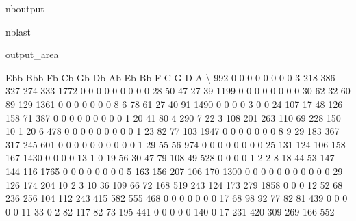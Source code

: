 \documentclass[letterpaper,10pt,english]{sphinxmanual}
\begin{document}
\begin{sphinxuseclass}{nboutput}
\begin{sphinxuseclass}{nblast}
{\begin{sphinxuseclass}{output_area}
\begin{sphinxuseclass}{}
\begin{sphinxVerbatim}[commandchars=\\\{\}]
      Ebb  Bbb  Fb   Cb   Gb   Db   Ab   Eb   Bb    F    C    G    D    A  \textbackslash{}
992     0    0   0    0    0    0    0    0    3  218  386  327  274  333
1772    0    0   0    0    0    0    0    0    0   28   50   47   27   39
1199    0    0   0    0    0    0    0    0   30   62   32   60   89  129
1361    0    0   0    0    0    0    0    8    6   78   61   27   40   91
1490    0    0   0    0    3    0    0   24  107   17   48  126  158   71
387     0    0   0    0    0    0    0    0    0    1   20   41   80    4
290     7   22   3  108  201  263  110   69  228  150   10    1   20    6
478     0    0   0    0    0    0    0    0    0    1   23   82   77  103
1947    0    0   0    0    0    0    0    8    9   29  183  367  317  245
601     0    0   0    0    0    0    0    0    0    0    1   29   55   56
974     0    0   0    0    0    0    0    0   25  131  124  106  158  167
1430    0    0   0    0   13    1    0   19   56   30   47   79  108   49
528     0    0   0    0    1    2    2    8   18   44   53  147  144  116
1765    0    0   0    0    0    0    0    0    5  163  156  207  106  170
1300    0    0   0    0    0    0    0    0    0    0    0   29  126  174
204    10    2   3   10   36  109   66   72  168  519  243  124  173  279
1858    0    0   0   12   52   68  236  256  104  112  243  415  582  555
468     0    0   0    0    0    0    0   17   68   98   92   77   82   81
439     0    0   0    0    0   11   33    0    2   82  117   82   73  195
441     0    0   0    0    0  140    0   17  231  420  309  269  166  552


\end{sphinxVerbatim}
\end{sphinxuseclass}
\end{sphinxuseclass}}
\end{sphinxuseclass}
\end{sphinxuseclass}
\end{document}
